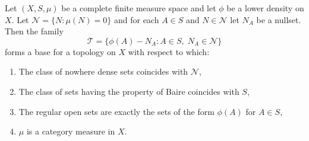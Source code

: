 Let $(X, S, \mu)$ be a complete finite measure space and let $\phi$ be a lower density on $X$. Let $\mathcal{N} = \{N : \mu(N) = 0\}$ and for each $A \in S$ and $N \in \mathcal{N}$ let $N_A$ be a nullset. Then the family
$$\mathcal{T} = \{\phi(A) - N_A : A \in S,\; N_A \in \mathcal{N}\}$$
forms a base for a topology on $X$ with respect to which:

\begin{enumerate}
\item The class of nowhere dense sets coincides with $\mathcal{N}$,
\item The class of sets having the property of Baire coincides with $S$,
\item The regular open sets are exactly the sets of the form $\phi(A)$ for $A \in S$,
\item $\mu$ is a category measure in $X$.
\end{enumerate}
